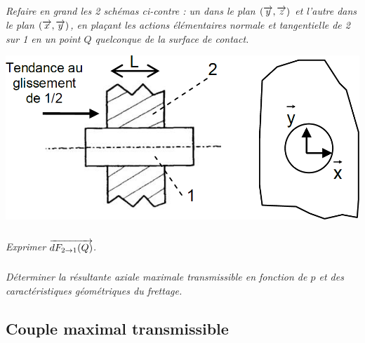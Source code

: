 \documentclass[10pt]{article}
\begin{document}
\begin{minipage}[c]{.55\linewidth}
\subparagraph{}
\textit{Refaire en grand les 2 schémas ci-contre : un 
dans le plan $(\overrightarrow{y}, \overrightarrow{z})$ et l’autre dans le plan $(\overrightarrow{x}, \overrightarrow{y})$, 
en plaçant les actions élémentaires normale et 
tangentielle de 2 sur 1 en un point $Q$ 
quelconque de la surface de contact. }

\end{minipage}\hfill
\begin{minipage}[c]{.4\linewidth}
\begin{center}
\includegraphics[width=.95\textwidth]{images/fig_03}
\end{center}
\end{minipage}

\subparagraph{}
\textit{Exprimer $\overrightarrow{dF_{2\rightarrow 1}(Q)}$.}

\subparagraph{}
\textit{Déterminer la résultante axiale maximale transmissible en fonction de $p$ et des 
caractéristiques géométriques du frettage. }

\subsection*{Couple maximal transmissible}
\end{document}
